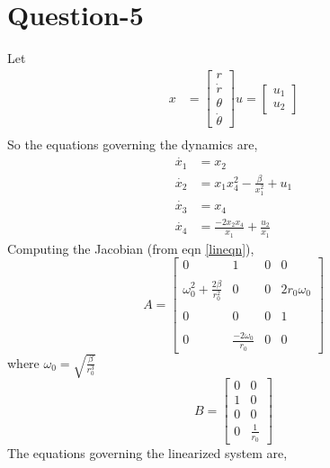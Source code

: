 \documentclass{article}
\begin{document}
\section*{Question-5}
Let 
\begin{align*}
    x &= \begin{bmatrix}r \\ \dot{r} \\ \theta \\ \dot{\theta} \end{bmatrix} 
    u = \begin{bmatrix}u_1 \\ u_2    \end{bmatrix} \\
\end{align*}
So the equations governing the dynamics are,
\begin{align}
    \dot{x_1} &= x_2 \\
    \dot{x_2} &= x_1x_4^2 - \frac{\beta}{x_1^2} + u_1 \\
    \dot{x_3} &= x_4 \\
    \dot{x_4} &= \frac{-2x_2x_4}{x_1} + \frac{u_2}{x_1}
\end{align}
Computing the Jacobian (from eqn \ref{lineqn}), \\
\begin{equation}
    A = \begin{bmatrix}  
    0 & 1 & 0 &  0 \\  \\
    \omega_0^2 + \frac{2\beta}{r_0^2} & 0 & 0 & 2r_0\omega_0\\  \\
    0 & 0 & 0 & 1\\ \\
    0 & \frac{-2\omega_0}{r_0} & 0 & 0
    \end{bmatrix}
\end{equation}
where $\omega_0 = \sqrt{\frac{\beta}{r_0^3}}$
\begin{equation}
    B = \begin{bmatrix}  
    0 & 0 \\
    1 & 0\\ 
    0 & 0\\
    0 & \frac{1}{r_0}
    \end{bmatrix}
\end{equation}
The equations governing the linearized system are,
\end{document}
